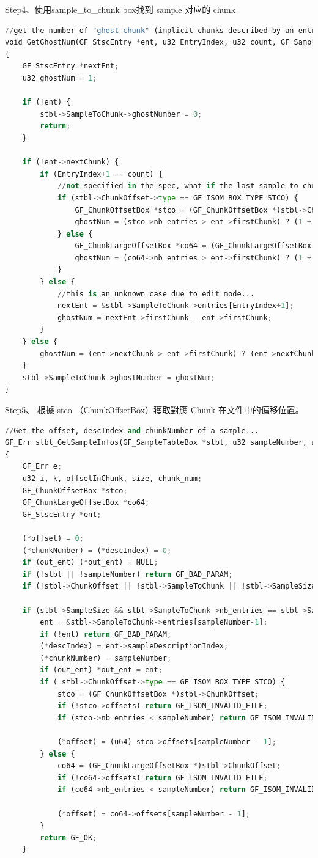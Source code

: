 \documentclass[10pt,UTF8]{ctexart}
\begin{document}
Step4、使⽤sample\_to\_chunk box找到 sample 对应的 chunk

\begin{lstlisting}[language={python}]
//get the number of "ghost chunk" (implicit chunks described by an entry)
void GetGhostNum(GF_StscEntry *ent, u32 EntryIndex, u32 count, GF_SampleTableBox *stbl)
{
	GF_StscEntry *nextEnt;
	u32 ghostNum = 1;

	if (!ent) {
		stbl->SampleToChunk->ghostNumber = 0;
		return;
	}

	if (!ent->nextChunk) {
		if (EntryIndex+1 == count) {
			//not specified in the spec, what if the last sample to chunk is no written?
			if (stbl->ChunkOffset->type == GF_ISOM_BOX_TYPE_STCO) {
				GF_ChunkOffsetBox *stco = (GF_ChunkOffsetBox *)stbl->ChunkOffset;
				ghostNum = (stco->nb_entries > ent->firstChunk) ? (1 + stco->nb_entries - ent->firstChunk) : 1;
			} else {
				GF_ChunkLargeOffsetBox *co64 = (GF_ChunkLargeOffsetBox *)stbl->ChunkOffset;
				ghostNum = (co64->nb_entries > ent->firstChunk) ? (1 + co64->nb_entries - ent->firstChunk) : 1;
			}
		} else {
			//this is an unknown case due to edit mode...
			nextEnt = &stbl->SampleToChunk->entries[EntryIndex+1];
			ghostNum = nextEnt->firstChunk - ent->firstChunk;
		}
	} else {
		ghostNum = (ent->nextChunk > ent->firstChunk) ? (ent->nextChunk - ent->firstChunk) : 1;
	}
	stbl->SampleToChunk->ghostNumber = ghostNum;
}
\end{lstlisting}

Step5、 根據 stco （ChunkOffsetBox）獲取對應 Chunk 在⽂件中的偏移位置。

\begin{lstlisting}[language={python}]
//Get the offset, descIndex and chunkNumber of a sample...
GF_Err stbl_GetSampleInfos(GF_SampleTableBox *stbl, u32 sampleNumber, u64 *offset, u32 *chunkNumber, u32 *descIndex, GF_StscEntry **out_ent)
{
	GF_Err e;
	u32 i, k, offsetInChunk, size, chunk_num;
	GF_ChunkOffsetBox *stco;
	GF_ChunkLargeOffsetBox *co64;
	GF_StscEntry *ent;

	(*offset) = 0;
	(*chunkNumber) = (*descIndex) = 0;
	if (out_ent) (*out_ent) = NULL;
	if (!stbl || !sampleNumber) return GF_BAD_PARAM;
	if (!stbl->ChunkOffset || !stbl->SampleToChunk || !stbl->SampleSize) return GF_ISOM_INVALID_FILE;

	if (stbl->SampleSize && stbl->SampleToChunk->nb_entries == stbl->SampleSize->sampleCount) {
		ent = &stbl->SampleToChunk->entries[sampleNumber-1];
		if (!ent) return GF_BAD_PARAM;
		(*descIndex) = ent->sampleDescriptionIndex;
		(*chunkNumber) = sampleNumber;
		if (out_ent) *out_ent = ent;
		if ( stbl->ChunkOffset->type == GF_ISOM_BOX_TYPE_STCO) {
			stco = (GF_ChunkOffsetBox *)stbl->ChunkOffset;
			if (!stco->offsets) return GF_ISOM_INVALID_FILE;
			if (stco->nb_entries < sampleNumber) return GF_ISOM_INVALID_FILE;

			(*offset) = (u64) stco->offsets[sampleNumber - 1];
		} else {
			co64 = (GF_ChunkLargeOffsetBox *)stbl->ChunkOffset;
			if (!co64->offsets) return GF_ISOM_INVALID_FILE;
			if (co64->nb_entries < sampleNumber) return GF_ISOM_INVALID_FILE;

			(*offset) = co64->offsets[sampleNumber - 1];
		}
		return GF_OK;
	}
\end{lstlisting}
\end{document}
